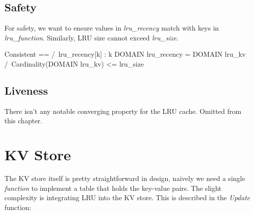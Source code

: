 \subsection{Safety}

For safety, we want to ensure values in \textit{lru\_recency} match with keys
in \textit{lru\_function}. Similarly, LRU size cannot exceed \textit{lru\_size}.\\

\begin{tla}
    Consistent ==
    /\ {lru_recency[k] : k \in DOMAIN lru_recency} = DOMAIN lru_kv
    /\ Cardinality(DOMAIN lru_kv) <= lru_size
\end{tla}
\begin{tlatex}
%
%
\end{tlatex}

\subsection{Liveness}

There isn't any notable converging property for the LRU cache. Omitted from this chapter. 

\section{KV Store}

The KV store itself is pretty straightforward in design, naively we need a
single \textit{function} to implement a table that holds the key-value pairs.
The slight complexity is integrating LRU into the KV store. This is described in
the \textit{Update} function:\\

